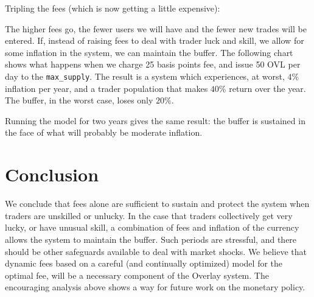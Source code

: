 \documentclass[11pt]{article}
\begin{document}
    Tripling the fees (which is now getting a little expensive):

    

    The higher fees go, the fewer users we will have and the fewer new
trades will be entered. If, instead of raising fees to deal with trader
luck and skill, we allow for some inflation in the system, we can
maintain the buffer. The following chart shows what happens when we
charge 25 basis points fee, and issue 50 OVL per day to the
\texttt{max\_supply}. The result is a system which experiences, at
worst, \(4\%\) inflation per year, and a trader population that makes
\(40\%\) return over the year. The buffer, in the worst case, loses only
\(20\%\).

    

    Running the model for two years gives the same result: the buffer is
sustained in the face of what will probably be moderate inflation.

    

    \section{Conclusion}\label{conclusion}

    We conclude that fees alone are sufficient to sustain and protect the
system when traders are unskilled or unlucky. In the case that traders
collectively get very lucky, or have unusual skill, a combination of
fees and inflation of the currency allows the system to maintain the
buffer. Such periods are stressful, and there should be other safeguards
available to deal with market shocks. We believe that dynamic fees based
on a careful (and continually optimized) model for the optimal fee, will
be a necessary component of the Overlay system. The encouraging analysis
above shows a way for future work on the monetary policy.


    
    
    
    
\end{document}
